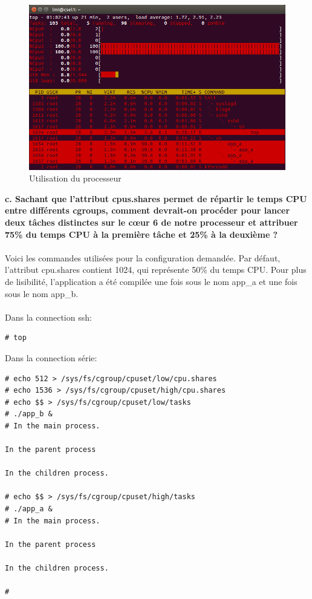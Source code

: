 \begin{figure}[H]
	\begin{center}
		\includegraphics[width=13cm]{img/multiprocessCGroup.png}
		\caption{Utilisation du processeur}
		\label{multiprocess1}
	\end{center}
\end{figure}
\textbf{c. Sachant	que	l’attribut	cpus.shares permet	de	répartir	le	temps	CPU	entre	différents	
	cgroups,	comment devrait-on	procéder	pour	lancer deux	tâches	distinctes	sur	le	cœur	6	de	
	notre	processeur	et	attribuer	75\%	du	temps	CPU	à	la	première	tâche	et	25\%	à	la	deuxième ?}\\\\
Voici les commandes utilisées pour la configuration demandée. Par défaut, l'attribut cpu.shares contient 1024, qui représente 50\% du temps CPU. Pour plus de lisibilité, l'application a été compilée une fois sous le nom app\_a et une fois sous le nom app\_b.\\\\
Dans la connection ssh:\\
\begin{lstlisting}
# top
\end{lstlisting}
Dans la connection série:\\
\begin{lstlisting}
# echo 512 > /sys/fs/cgroup/cpuset/low/cpu.shares 
# echo 1536 > /sys/fs/cgroup/cpuset/high/cpu.shares  
# echo $$ > /sys/fs/cgroup/cpuset/low/tasks                                     
# ./app_b &                                                                     
# In the main process.                                                          

In the parent process                                                           

In the children process.                                                        

# echo $$ > /sys/fs/cgroup/cpuset/high/tasks                                    
# ./app_a &                                                                     
# In the main process.                                                          

In the parent process                                                           

In the children process.                                                        

# 
\end{lstlisting}
